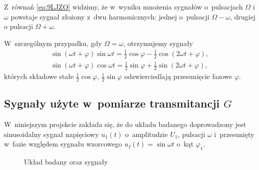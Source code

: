 \documentclass[paper=a4,DIV=12]{tfa}
\begin{document}
Z~równań \eqref{eq:9LJZO} widzimy, że w~wyniku mnożenia sygnałów
o~pulsacjach $\Omega$ i $\omega$ powstaje sygnał złożony z~dwu harmonicznych:
jednej o~pulsacji $\Omega - \omega$, drugiej o pulsacji $\Omega + \omega$.

W~szczególnym przypadku, gdy $\Omega = \omega$, otrzymujemy sygnały
\begin{subequations}
  \label{eq:EE55O}
  \begin{align}
    &
    \sin \left(\omega t + \varphi\right) \sin\omega t
    =
    \frac{1}{2} \cos{\varphi} - \frac{1}{2} \cos{(2 \omega t + \varphi)},
    &
    \label{eq:U3M0L}
    \\
    &
    \sin \left(\omega t + \varphi\right) \cos \omega t
    =
    \frac{1}{2} \sin{\varphi} + \frac{1}{2} \sin{(2 \omega t + \varphi)},
    &
    \label{eq:2ENFD}
  \end{align}
\end{subequations}
których składowe stałe $\frac{1}{2}\cos\varphi$, $\frac{1}{2}\sin\varphi$
odzwierciedlają przesunięcie fazowe $\varphi$.

\subsection{Sygnały użyte w~pomiarze transmitancji $G$}
\label{sec:I1HGZ}

W~niniejszym projekcie zakłada się, że do układu badanego doprowadzony jest
sinusoidalny sygnał napięciowy $u_1(t)$ o~amplitudzie $U_1$, pulsacji $\omega$
i~przesunięty w~fazie względem sygnału wzorcowego $u_I(t) = \sin{\omega t}$
o~kąt $\varphi_1$.
\begin{figure}[htbp]
  \centering
  \caption{Układ badany oraz sygnały}
  \label{fig:6DR1S}
\end{figure}
\end{document}
